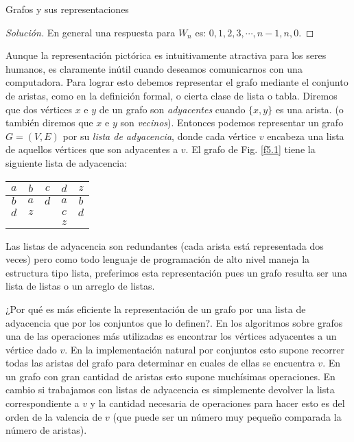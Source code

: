 \begin{section}{Grafos y sus representaciones}
\begin{proof}[Solución]
        En  general una respuesta para $W_n$ es: $0,1,2,3,\cdots,n-1,n,0$.   
\end{proof}

Aunque la representación pictórica es intuitivamente atractiva para los seres humanos, es claramente inútil cuando deseamos comunicarnos con una computadora. Para lograr esto debemos re\-pre\-sen\-tar el grafo mediante el conjunto de aristas, como en la definición formal, o cierta clase de lista o tabla. Diremos que dos vértices $x$ e $y$ de un grafo son \textit{adyacentes} cuando $\{x,y\}$ es una arista.  (o también diremos que $x$ e $y$ son \textit{vecinos}).  Entonces podemos representar un grafo $G=(V,E)$ por su \textit{lista de adyacencia},   donde cada vértice $v$ encabeza una lista de aquellos vértices que son adyacentes a $v$. El grafo de Fig. \ref{f5.1} tiene la siguiente lista de adyacencia:

\begin{center}
\begin{tabular}{ccccc}
$a$&$b$&$c$&$d$&$z$ \\ \hline
$b$&$a$&$d$&$a$&$b$ \\
$d$&$z$&&$c$&$d$\\
&&&$z$&
\end{tabular}
\end{center}

Las listas de adyacencia son redundantes (cada arista está representada dos veces) pero como todo lenguaje de programación de alto nivel maneja la estructura tipo lista,  preferimos esta representación pues  un grafo  resulta ser una lista de listas  o un  arreglo de listas.  

\begin{observacion*}
    ¿Por qué es más eficiente la representación de un grafo por una lista de adyacencia que por los conjuntos que lo definen?. En  los algoritmos sobre grafos una de las operaciones más utilizadas es encontrar los vértices adyacentes a un vértice dado $v$. En la implementación natural por conjuntos  esto supone recorrer todas las aristas del grafo para determinar en cuales de ellas se encuentra $v$. En un grafo  con gran cantidad de aristas esto supone muchísimas operaciones. En cambio si trabajamos con listas de adyacencia es simplemente devolver la lista correspondiente a $v$ y la cantidad necesaria de operaciones para hacer esto es del orden de la valencia de $v$ (que puede ser un número muy pequeño comparada la número de aristas).   
\end{observacion*}



\end{section}
